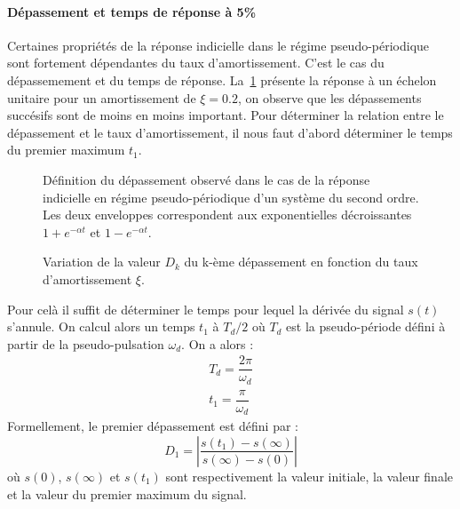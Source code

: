\paragraph{Dépassement et temps de réponse à 5\%}
Certaines propriétés de la réponse indicielle dans le régime pseudo-périodique 
sont fortement dépendantes du taux d'amortissement. C'est le cas du 
dépassemement et du temps de réponse. La~\cref{fig-2nd_depassement_1} présente 
la réponse à un échelon unitaire pour un amortissement de $\xi=0.2$, 
on observe que les dépassements succésifs sont de moins en moins important. 
Pour déterminer la relation entre le dépassement et le taux d'amortissement, 
il nous faut d'abord déterminer le temps du premier maximum $t_1$.
\begin{figure}[!h]
    \centering
    \resizebox{0.5\linewidth}{!}{
    
    }
    \caption{Définition du dépassement observé dans le cas de la réponse 
             indicielle en régime pseudo-périodique d'un système du second 
             ordre. Les deux enveloppes correspondent aux exponentielles 
             décroissantes $1+e^{-\alpha t}$ et $1-e^{-\alpha t}$. 
             \label{fig-2nd_depassement_1}}
\end{figure}
\begin{figure}[!h]
    \centering
    \resizebox{0.6\linewidth}{!}{
    
    }
    \caption{Variation de la valeur $D_k$ du k-ème dépassement en fonction 
             du taux d'amortissement $\xi$. \label{fig-2nd_depassement_2}}
\end{figure}
Pour celà il suffit de déterminer le temps pour lequel la dérivée 
du signal $s(t)$ s'annule. On calcul alors un temps $t_1$ à $T_d/2$ 
où $T_d$ est la pseudo-période défini à partir de la 
pseudo-pulsation $\omega_d$. 
On a alors :
\begin{align*}
T_d=\dfrac{2\pi}{\omega_d}\\
t_1 = \dfrac{\pi}{\omega_d}
\end{align*}
Formellement, le premier dépassement est défini par :
\[
D_1=\left|\dfrac{s(t_1)-s(\infty)}{s(\infty)-s(0)}\right|
\]
où $s(0)$, $s(\infty)$ et $s(t_1)$ sont respectivement la valeur initiale, 
la valeur finale et la valeur du premier maximum du signal.

